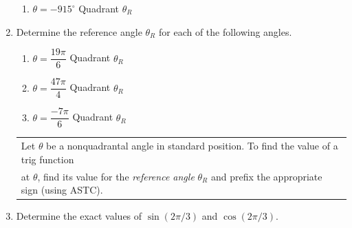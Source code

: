\begin{enumerate}
\begin{enumerate}
\item $\theta = -915^\circ$ \hspace{1in} Quadrant \underline{\phantom{sldkjfslkdjf}} \hspace{1in} $\theta_R$ \underline{\phantom{sldkjfslkdjf}}  \\[.8in]

\end{enumerate}

\item Determine the reference angle $\theta_R$ for each of the following angles. 
\begin{enumerate}

\item $\theta = \dfrac{19\pi}{6}$ \hspace{1in} Quadrant \underline{\phantom{sldkjfslkdjf}} \hspace{1in} $\theta_R$ \underline{\phantom{sldkjfslkdjf}} \vfill
\item $\theta = \dfrac{47\pi}{4}$ \hspace{1in} Quadrant \underline{\phantom{sldkjfslkdjf}} \hspace{1in} $ \theta_R$ \underline{\phantom{sldkjfslkdjf}} \vfill
\item $\theta = \dfrac{-7\pi}{6}$ \hspace{1in} Quadrant \underline{\phantom{sldkjfslkdjf}} \hspace{1in} $\theta_R$ \underline{\phantom{sldkjfslkdjf}} \vfill

\end{enumerate}

\newpage


\hspace{-.3in}\begin{tabular}{| l |} \hline
Let $\theta$ be a nonquadrantal angle in standard position. To find the value of a trig function\\ at $\theta$, find its value for the \emph{reference angle} $\theta_R$ and prefix the appropriate sign (using ASTC). \\ \hline
\end{tabular}

\item Determine the exact values of $\sin(2\pi/3)$ and $\cos(2\pi/3)$. \\[1.5in] %



\end{enumerate}
